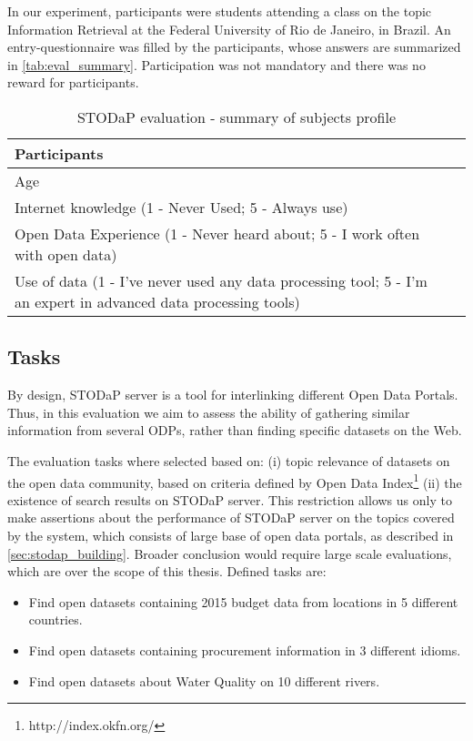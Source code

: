 In our experiment, participants were students attending a class on the topic Information Retrieval at the Federal University of Rio de Janeiro, in Brazil.
An entry-questionnaire was filled by the participants, whose answers are summarized in \autoref{tab:eval_summary}.
Participation was not mandatory and there was no reward for participants.

\begin{table}[]
\ABNTEXfontereduzida
\centering
\caption{STODaP evaluation - summary of subjects profile}
\label{tab:eval_summary}
\begin{tabular}{|p{8cm}|p{2cm}|}
\hline
Participants & \\ \hline
Age & \\ \hline
Internet knowledge (1 - Never Used; 5 - Always use) & \\ \hline
Open Data Experience (1 - Never heard about; 5 - I work often with open data) & \\ \hline
Use of data (1 - I've never used any data processing tool; 5 - I'm an expert in advanced data processing tools) & \\ \hline
\end{tabular}
\end{table}

\subsection{Tasks}

By design, STODaP server is a tool for interlinking different Open Data Portals.
Thus, in this evaluation we aim to assess the ability of gathering similar information from several ODPs, rather than finding specific datasets on the Web.

The evaluation tasks where selected based on: (i) topic relevance of datasets on the open data community, based on criteria defined by Open Data Index\footnote{http://index.okfn.org/} (ii) the existence of search results on STODaP server.
This restriction allows us only to make assertions about the performance of STODaP server on the topics covered by the system, which consists of large base of open data portals, as described in \autoref{sec:stodap_building}.
Broader conclusion would require large scale evaluations, which are over the scope of this thesis.
Defined tasks are:

\begin{itemize}
	\item Find open datasets containing 2015 budget data from locations in 5 different countries.
	\item Find open datasets containing procurement information in 3 different idioms.
	\item Find open datasets about Water Quality on 10 different rivers.
\end{itemize}

